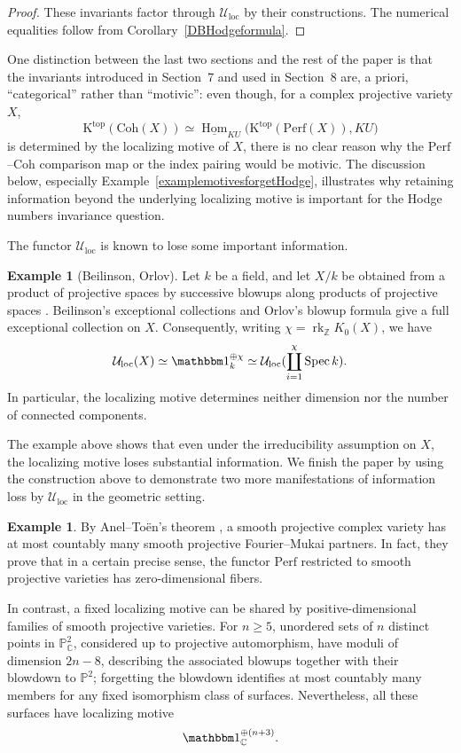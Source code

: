\documentclass{amsart}
\theoremstyle{plain}
\theoremstyle{definition}
\newtheorem{example}[prop]{Example}
\newcommand{\bbC}{\mathbb{C}}
\newcommand{\bbZ}{\mathbb{Z}}
\newcommand{\Perf}{\mathrm{Perf}}
\newcommand{\Uloc}{\mathcal U_{\mathrm{loc}}}
\newcommand{\bbP}{\mathbb{P}}
\newcommand{\K}{\mathrm{K}}
\newcommand{\Coh}{\mathrm{Coh}}
\DeclareMathOperator{\Spec}{Spec}
\begin{document}
\begin{proof}
These invariants factor through $\Uloc$ by their constructions. The numerical equalities follow from Corollary~\ref{DBHodgeformula}.
\end{proof}

One distinction between the last two sections and the rest of the paper is that the invariants introduced in Section~7
and used in Section~8 are, a priori, ``categorical'' rather than ``motivic'': even though, for a complex projective variety $X$,
\[
\K^{\mathrm{top}}(\Coh(X))\simeq
\underline{\operatorname{Hom}}_{KU}
\bigl(\K^{\mathrm{top}}(\Perf(X)),KU\bigr)
\]
is determined by the localizing motive of $X$, there is no clear reason why the $\Perf$--$\Coh$ comparison map or the index pairing would be motivic.
The discussion below, especially Example~\ref{examplemotivesforgetHodge}, illustrates why retaining information beyond the underlying localizing motive is important for the Hodge numbers invariance question.

\medskip

The functor $\Uloc$ is known to lose some important information.

\begin{example}[Beilinson, Orlov]
Let $k$ be a field, and let $X/k$ be obtained from a product of projective spaces by successive blowups along
products of projective spaces
.
Beilinson's exceptional collections \cite{Bei78} and Orlov's blowup formula
\cite[Theorem~4.3 and Corollary~4.4]{Orl93}
give a full exceptional collection on $X$.
 Consequently, writing
$\chi=\operatorname{rk}_{\bbZ}K_0(X)$, we have
\[
\Uloc(X)\simeq\mathbbm1_k^{\oplus \chi}
\simeq
\Uloc(\coprod_{i=1}^{\chi}\Spec k).
\]
In particular, the localizing motive determines neither dimension nor the number of connected components.
\end{example}

The example above shows that even under the irreducibility assumption on $X$, the localizing motive loses substantial information.
We finish the paper by using the construction above to demonstrate two more manifestations of information loss by $\Uloc$ in the geometric setting.

\begin{example}
By Anel--To\"en's theorem \cite[Corollary~7.1]{AT09}, a smooth projective complex variety has at most countably many smooth projective Fourier--Mukai partners. In fact, they prove that in a certain precise sense, the functor $\Perf$ restricted to smooth projective varieties has zero-dimensional fibers.

In contrast, a fixed localizing motive can be shared by positive-dimensional families of smooth projective varieties. For $n\ge5$, unordered sets of $n$ distinct points in $\bbP^2_\bbC$, considered up to projective automorphism, have moduli of dimension $2n-8$, describing the associated blowups together with their blowdown to $\bbP^2$; forgetting the blowdown identifies at most countably many members for any fixed isomorphism class of surfaces.
Nevertheless, all these surfaces have localizing motive
\[
\mathbbm1_\bbC^{\oplus(n+3)}.
\]
\end{example}
\end{document}
